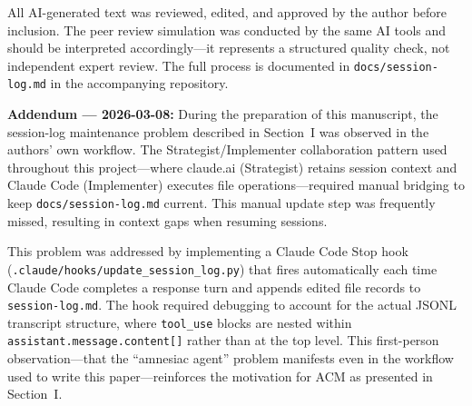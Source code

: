\documentclass[conference]{IEEEtran}
\begin{document}
All AI-generated text was reviewed, edited, and approved by the author before inclusion. The peer review simulation was conducted by the same AI tools and should be interpreted accordingly---it represents a structured quality check, not independent expert review. The full process is documented in \texttt{docs/session-log.md} in the accompanying repository.

\textbf{Addendum --- 2026-03-08:}
During the preparation of this manuscript, the session-log maintenance problem described in Section~I was observed in the authors' own workflow. The Strategist/Implementer collaboration pattern used throughout this project---where claude.ai (Strategist) retains session context and Claude Code (Implementer) executes file operations---required manual bridging to keep \texttt{docs/session-log.md} current. This manual update step was frequently missed, resulting in context gaps when resuming sessions.

This problem was addressed by implementing a Claude Code Stop hook (\texttt{.claude/hooks/update\_session\_log.py}) that fires automatically each time Claude Code completes a response turn and appends edited file records to \texttt{session-log.md}. The hook required debugging to account for the actual JSONL transcript structure, where \texttt{tool\_use} blocks are nested within \texttt{assistant.message.content[]} rather than at the top level. This first-person observation---that the ``amnesiac agent'' problem manifests even in the workflow used to write this paper---reinforces the motivation for ACM as presented in Section~I.



\end{document}
